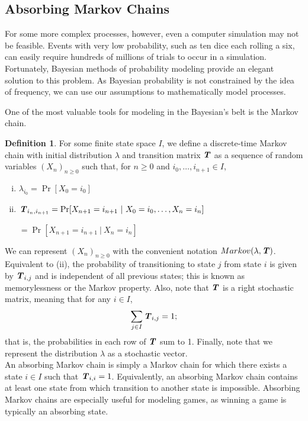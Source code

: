 \documentclass{article}
\newcommand{\T}{\textbf{\textit{T}}}
\theoremstyle{definition}
\newtheorem{defn}{Definition}
\theoremstyle{plain}
\begin{document}
	\subsection{Absorbing Markov Chains}
	For some more complex processes, however, even a computer simulation may not be feasible. Events with very low probability, such as ten dice each rolling a six, can easily require hundreds of millions of trials to occur in a simulation. Fortunately, Bayesian methods of probability modeling provide an elegant solution to this problem. As Bayesian probability is not constrained by the idea of frequency, we can use our assumptions to mathematically model processes.


	One of the most valuable tools for modeling in the Bayesian's belt is the Markov chain. 

\begin{defn}
For some finite state space $I$, we define a discrete-time Markov chain with initial distribution $\lambda$ and transition matrix $\T$ as a  sequence of random variables $(X_n)_{n \geq 0}$ such that, for $n \geq 0$ and $i_0, \dots, i_{n+1} \in I$,
	\begin{enumerate}[(i)]
	\item $\lambda_{i_0} = \Pr[X_0 = i_0]$  
	\item $\T_{i_n, i_{n+1}} = \Pr[X_{n+1} = i_{n+1} ~|~ {X_0 = i_0}, \dots, X_{n}=i_n]$

	\hspace{3.7em}$ = \Pr[X_{n+1} = i_{n+1} ~|~ X_{n} = i_n]$
	\end{enumerate}
\end{defn}
We can represent $(X_n)_{n \geq 0}$ with the convenient notation $Markov(\lambda, \T)$. Equivalent to (ii), the probability of transitioning to state $j$ from state $i$ is given by $\T_{i, j}$ and is independent of all previous states; this is known as memorylessness or the Markov property. Also, note that $\T$ is a right stochastic matrix, meaning that for any $i \in I$, \[\sum_{j\in I} \T_{i, j} = 1;\] that is, the probabilities in each row of $\T$ sum to 1. Finally, note that we represent the distribution $\lambda$ as a stochastic vector.
\\
	
	An absorbing Markov chain is simply a Markov chain for which there exists a state $i \in I$ such that $\T_{i,i} = 1$. Equivalently, an absorbing Markov chain contains at least one state from which transition to another state is impossible. Absorbing Markov chains are especially useful for modeling games, as winning a game is typically an absorbing state.
	
\end{document}

